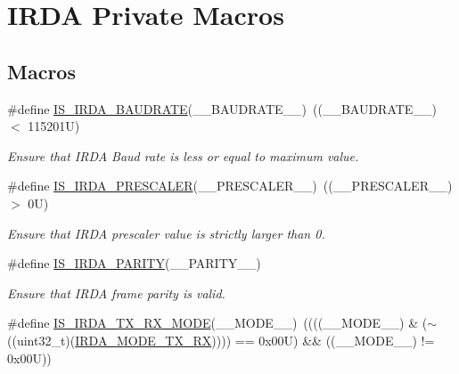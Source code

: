 \hypertarget{group___i_r_d_a___private___macros}{}\section{I\+R\+DA Private Macros}
\label{group___i_r_d_a___private___macros}
\subsection*{Macros}
\begin{DoxyCompactItemize}
\item 
\#define \hyperlink{group___i_r_d_a___private___macros_gac2fec9bcc7ccdd8ccdd7ab75246860d5}{I\+S\+\_\+\+I\+R\+D\+A\+\_\+\+B\+A\+U\+D\+R\+A\+TE}(\+\_\+\+\_\+\+B\+A\+U\+D\+R\+A\+T\+E\+\_\+\+\_\+)~((\+\_\+\+\_\+\+B\+A\+U\+D\+R\+A\+T\+E\+\_\+\+\_\+) $<$ 115201\+U)
\begin{DoxyCompactList}\small\item\em Ensure that I\+R\+DA Baud rate is less or equal to maximum value. \end{DoxyCompactList}\item 
\#define \hyperlink{group___i_r_d_a___private___macros_ga62a58f1171d6c619a18845e2a418853c}{I\+S\+\_\+\+I\+R\+D\+A\+\_\+\+P\+R\+E\+S\+C\+A\+L\+ER}(\+\_\+\+\_\+\+P\+R\+E\+S\+C\+A\+L\+E\+R\+\_\+\+\_\+)~((\+\_\+\+\_\+\+P\+R\+E\+S\+C\+A\+L\+E\+R\+\_\+\+\_\+) $>$ 0\+U)
\begin{DoxyCompactList}\small\item\em Ensure that I\+R\+DA prescaler value is strictly larger than 0. \end{DoxyCompactList}\item 
\#define \hyperlink{group___i_r_d_a___private___macros_ga21d1f4784a9e003b3195e27b22173e69}{I\+S\+\_\+\+I\+R\+D\+A\+\_\+\+P\+A\+R\+I\+TY}(\+\_\+\+\_\+\+P\+A\+R\+I\+T\+Y\+\_\+\+\_\+)
\begin{DoxyCompactList}\small\item\em Ensure that I\+R\+DA frame parity is valid. \end{DoxyCompactList}\item 
\#define \hyperlink{group___i_r_d_a___private___macros_ga31f1a9c7b9046663256277c2f639dbaf}{I\+S\+\_\+\+I\+R\+D\+A\+\_\+\+T\+X\+\_\+\+R\+X\+\_\+\+M\+O\+DE}(\+\_\+\+\_\+\+M\+O\+D\+E\+\_\+\+\_\+)~((((\+\_\+\+\_\+\+M\+O\+D\+E\+\_\+\+\_\+) \& ($\sim$((uint32\+\_\+t)(\hyperlink{group___i_r_d_a___transfer___mode_gada775794a25b76b7ecafc9bea3fc1f8a}{I\+R\+D\+A\+\_\+\+M\+O\+D\+E\+\_\+\+T\+X\+\_\+\+RX})))) == 0x00\+U) \&\& ((\+\_\+\+\_\+\+M\+O\+D\+E\+\_\+\+\_\+) != 0x00\+U))

\end{DoxyCompactItemize}
